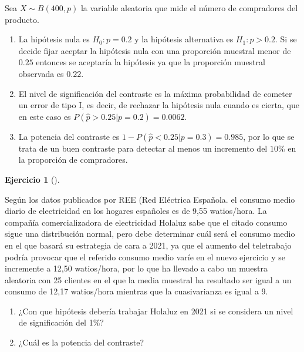 \documentclass[
  a4paper,
]{scrreport}
\theoremstyle{definition}
\newtheorem{exercise}{Ejercicio}[chapter]
\theoremstyle{remark}
\begin{document}
\begin{tcolorbox}[enhanced jigsaw, colframe=quarto-callout-tip-color-frame, breakable, opacityback=0, titlerule=0mm, opacitybacktitle=0.6, bottomtitle=1mm, toptitle=1mm, colback=white, leftrule=.75mm, colbacktitle=quarto-callout-tip-color!10!white, arc=.35mm, rightrule=.15mm, left=2mm, bottomrule=.15mm, toprule=.15mm, title=\textcolor{quarto-callout-tip-color}{\faLightbulb}\hspace{0.5em}{Solución}, coltitle=black]

Sea \(X\sim B(400,p)\) la variable aleatoria que mide el número de
compradores del producto.

\begin{enumerate}
\def\labelenumi{\alph{enumi}.}
\item
  La hipótesis nula es \(H_0: p=0.2\) y la hipótesis alternativa es
  \(H_1: p> 0.2\). Si se decide fijar aceptar la hipótesis nula con una
  proporción muestral menor de \(0.25\) entonces se aceptaría la
  hipótesis ya que la proporción muestral observada es \(0.22\).
\item
  El nivel de significación del contraste es la máxima probabilidad de
  cometer un error de tipo I, es decir, de rechazar la hipótesis nula
  cuando es cierta, que en este caso es
  \(P(\hat p>0.25|p=0.2) = 0.0062\).
\item
  La potencia del contraste es \(1-P(\hat p<0.25|p=0.3) = 0.985\), por
  lo que se trata de un buen contraste para detectar al menos un
  incremento del \(10\)\% en la proporción de compradores.
\end{enumerate}

\end{tcolorbox}

\begin{exercise}[]\protect\hypertarget{exr-contraste-media-consumo-electrico}{}\label{exr-contraste-media-consumo-electrico}

Según los datos publicados por REE (Red Eléctrica Española. el consumo
medio diario de electricidad en los hogares españoles es de 9,55
watios/hora. La compañía comercializadora de electricidad Holaluz sabe
que el citado consumo sigue una distribución normal, pero debe
determinar cuál será el consumo medio en el que basará su estrategia de
cara a 2021, ya que el aumento del teletrabajo podría provocar que el
referido consumo medio varíe en el nuevo ejercicio y se incremente a
12,50 watios/hora, por lo que ha llevado a cabo un muestra aleatoria con
25 clientes en el que la media muestral ha resultado ser igual a un
consumo de 12,17 watios/hora mientras que la cuasivarianza es igual a 9.

\begin{enumerate}
\def\labelenumi{\alph{enumi}.}
\item
  ¿Con que hipótesis debería trabajar Holaluz en 2021 si se considera un
  nivel de significación del 1\%?
\item
  ¿Cuál es la potencia del contraste?
\end{enumerate}

\end{exercise}
\end{document}
